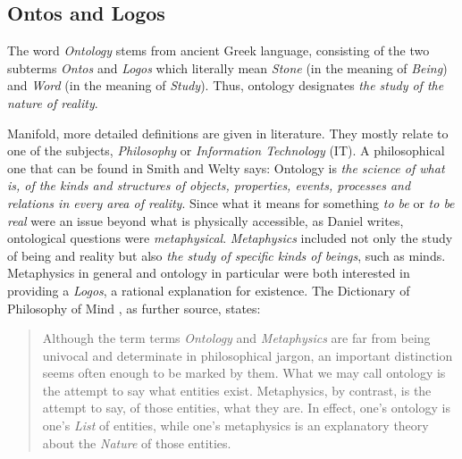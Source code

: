 %
%
%
%
%
%
%

\subsection{Ontos and Logos}
\label{ontos_and_logos_heading}

The word \emph{Ontology} stems from ancient Greek language, consisting of the
two subterms \emph{Ontos} and \emph{Logos} which literally mean \emph{Stone} (in
the meaning of \emph{Being}) and \emph{Word} (in the meaning of \emph{Study}).
Thus, ontology designates \emph{the study of the nature of reality}.

Manifold, more detailed definitions are given in literature. They mostly relate
to one of the subjects, \emph{Philosophy} or \emph{Information Technology}
(IT). A philosophical one that can be found in Smith and Welty \cite{smith}
says: Ontology is \emph{the science of what is, of the kinds and structures of
objects, properties, events, processes and relations in every area of reality}.
Since what it means for something \emph{to be} or \emph{to be real} were an
issue beyond what is physically accessible, as Daniel \cite{daniel} writes,
ontological questions were \emph{metaphysical}. \emph{Metaphysics} included not
only the study of being and reality but also \emph{the study of specific kinds
of beings}, such as minds. Metaphysics in general and ontology in particular
were both interested in providing a \emph{Logos}, a rational explanation for
existence. The Dictionary of Philosophy of Mind \cite{pomdictionary}, as
further source, states:

\begin{quote}
    Although the term terms \emph{Ontology} and \emph{Metaphysics} are far from
    being univocal and determinate in philosophical jargon, an important
    distinction seems often enough to be marked by them. What we may call
    ontology is the attempt to say what entities exist. Metaphysics, by
    contrast, is the attempt to say, of those entities, what they are. In
    effect, one's ontology is one's \emph{List} of entities, while one's
    metaphysics is an explanatory theory about the \emph{Nature} of those
    entities.
\end{quote}

